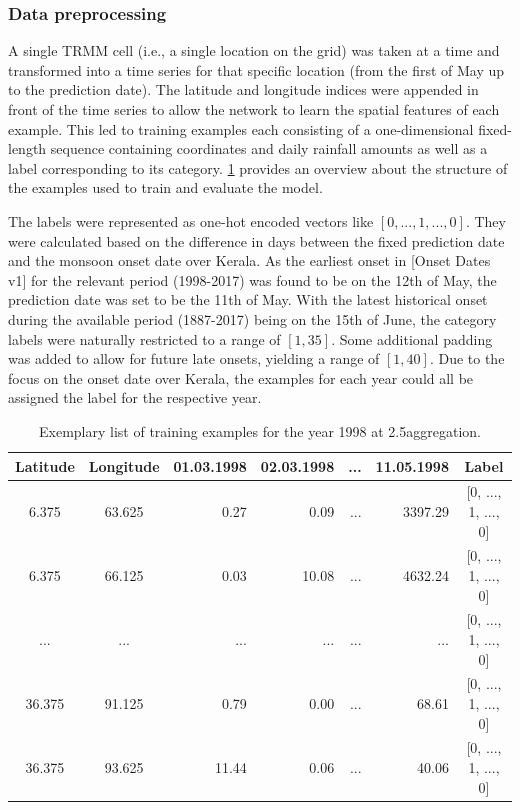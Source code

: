 \subsubsection{Data preprocessing}
\label{ssst:nn_t2_data}
A single TRMM cell (i.e., a single location on the grid) was taken at a time and transformed into a time series for that specific location (from the first of May up to the prediction date). The latitude and longitude indices were appended in front of the time series to allow the network to learn the spatial features of each example. This led to training examples each consisting of a one-dimensional fixed-length sequence containing coordinates and daily rainfall amounts as well as a label corresponding to its category. \cref{tab:nn_t2_data} provides an overview about the structure of the examples used to train and evaluate the model.

The labels were represented as one-hot encoded vectors like $\left[ 0, ..., 1, ..., 0 \right]$. They were calculated based on the difference in days between the fixed prediction date and the monsoon onset date over Kerala. As the earliest onset in [Onset Dates v1] for the relevant period (1998-2017) was found to be on the 12th of May, the prediction date was set to be the 11th of May. With the latest historical onset during the available period (1887-2017) being on the 15th of June, the category labels were naturally restricted to a range of $\left[ 1, 35 \right]$. Some additional padding was added to allow for future late onsets, yielding a range of $\left[ 1, 40 \right]$. Due to the focus on the onset date over Kerala, the examples for each year could all be assigned the label for the respective year.

\begin{table}[h]
  \centering
  \begin{tabular}{|ccrrrr||c|}
    \hline
    Latitude & Longitude & 01.03.1998 & 02.03.1998 & ... & 11.05.1998 & Label \\
    \hline
    \hline
    6.375 & 63.625 & 0.27 & 0.09 & ... & 3397.29 & [0, ..., 1, ..., 0] \\
    6.375 & 66.125 & 0.03 & 10.08 & ... & 4632.24 & [0, ..., 1, ..., 0] \\
    ... & ... & ... & ... & ... & ... & [0, ..., 1, ..., 0] \\
    36.375 & 91.125 & 0.79 & 0.00 & ... & 68.61 & [0, ..., 1, ..., 0] \\
    36.375 & 93.625 & 11.44 & 0.06 & ... & 40.06 & [0, ..., 1, ..., 0] \\
    \hline
  \end{tabular}
  \caption{Exemplary list of training examples for the year 1998 at 2.5\degree aggregation.}
  \label{tab:nn_t2_data}
\end{table}

